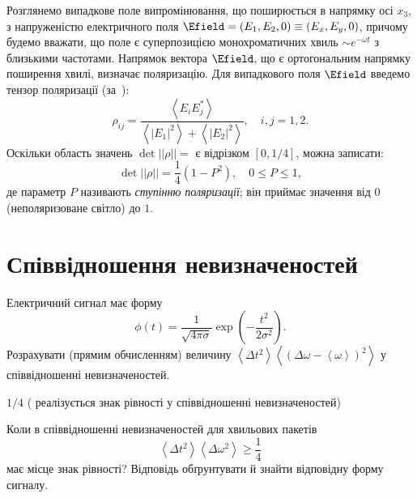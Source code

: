 \begin{Theory}
Розглянемо випадкове поле випромінювання, що поширюється в напрямку осі $x_3$, з напруженістю електричного поля  $\Efield = (E_1,E_2,0) \equiv
(E_x,E_y,0)$, причому будемо вважати, що поле є суперпозицією монохроматичних хвиль $\sim e^{-\omega t}$  з близькими частотами. Напрямок вектора
$\Efield$, що є ортогональним напрямку поширення хвилі, визначає поляризацію. Для випадкового поля $\Efield$ введемо тензор поляризації (за~\cite{LL2}):
	\begin{equation}\label{eq:polarization_tensor}
		\rho_{ij} = \frac{\left\langle E_{i} E_{j}^* \right\rangle }{\left\langle |E_1|^2\right\rangle + \left\langle |E_2|^2\right\rangle },\quad i,j =
		1,2.
	\end{equation}
Оскільки область значень $\det||\rho|| = $ є відрізком $[0,1/4]$, можна записати:
	\begin{equation}\label{eq:polarization_lewel}
		\det||\rho|| = \frac14(1 - P^2),\quad 0\le P \le 1,
	\end{equation}
де параметр $P$ називають \emph{ступінню поляризації}; він приймає значення від $0$ (неполяризоване світло) до $1$.
\end{Theory}




\section{Співвідношення невизначеностей}

\begin{problem}
Електричний сигнал має форму
\[
	\phi(t) = \frac{1}{\sqrt{4\pi\sigma}} \exp\left( -\frac{t^2}{2\sigma^2}\right).
\]
Розрахувати (прямим обчисленням) величину $\left\langle \Delta t^2 \right\rangle \left\langle \left(\Delta \omega  - \left\langle \omega  \right\rangle\right)^2 \right\rangle$  у співвідношенні невизначеностей.
\begin{solution}
	$1/4$ ( реалізується знак рівності у співвідношенні невизначеностей)
\end{solution}
\end{problem}


\begin{problem}
Коли в співвідношенні невизначеностей для хвильових пакетів
\[
	\left\langle \Delta t^2 \right\rangle\left\langle \Delta \omega^2 \right\rangle \ge \frac14
\]
має місце знак рівності? Відповідь обґрунтувати й знайти відповідну форму сигналу.
\end{problem}


